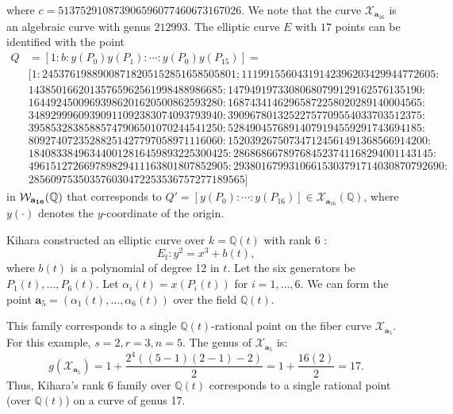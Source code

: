 \documentclass[11pt, a4paper]{amsart}
\theoremstyle{definition}
\newcommand{\Q}{\mathbb{Q}}
\newcommand{\Wc}{\mathcal{W}}
\newcommand{\Xc}{\mathcal{X}}
\newcommand{\ba}{\mathbf{a}}
\begin{document}
where $c=513752910873906596077460673167026$. We note that the curve $\Xc_{\ba_{16}}$ is an algebraic curve  with genus $212993$.
The elliptic curve $E$ with $17$ points can be identified with the  point
%
%
\begin{align*}
	Q  &  =[1:b: y(P_0)y(P_1): \cdots : y(P_0)y(P_{15})]=\\
	& [1: 24537619889008718205152851658505801; 11199155604319142396203429944772605: \\
	& 14385016620135765962561998488986685: 14794919733080680799129162576135190: \\
	& 16449245009693986201620500862593280: 16874341462965872258020289140004565: \\
	& 34892999609390911092383074093793940: 39096780132522757709554033703512375:\\
	& 39585328385885747906501070244541250 : 52849045768914079194559291743694185: \\
	& 80927407235288251427797058971116060:  152039267507347124561491368566914200: \\
	& 184083384963440012816459893225300425: 286868667897684523741168294001143145: \\
	& 496151272669789829411163801807852905 :  29380167993106615303791714030870792690:\\
	& 285609753503576030472253536757277189565]              
\end{align*}
in $\Wc_{\bf a_{16}}(\Q)$  that  corresponds to  $Q'=[y(P_0): \cdots : y(P_{16})] \in \Xc_{\ba_{16}}(\Q)$,
where $y(\cdot)$ denotes the $y$-coordinate of the origin.

Kihara constructed an elliptic curve over $k = \Q(t)$ with rank 6 \cite{Kihara1996}:
\[ E_t: y^2 = x^3 + b(t), \]
where $b(t)$ is a polynomial of degree 12 in $t$. Let the six generators be $P_1(t), \dots, P_6(t)$. Let $\alpha_i(t) = x(P_i(t))$ for $i=1,\dots,6$. We can form the point $\ba_5 = (\alpha_1(t), \dots, \alpha_6(t))$ over the field $\Q(t)$.

This family corresponds to a single $\Q(t)$-rational point on the fiber curve $\Xc_{\ba_5}$. For this example, $s=2, r=3, n=5$. The genus of $\Xc_{\ba_5}$ is:
\[ g(\Xc_{\ba_5}) = 1 + \frac{2^{4}((5-1)(2-1)-2)}{2} = 1 + \frac{16(2)}{2} = 17. \]
Thus, Kihara's rank 6 family over $\Q(t)$ corresponds to a single rational point (over $\Q(t)$) on a curve of genus 17.
\fi



\end{document}

